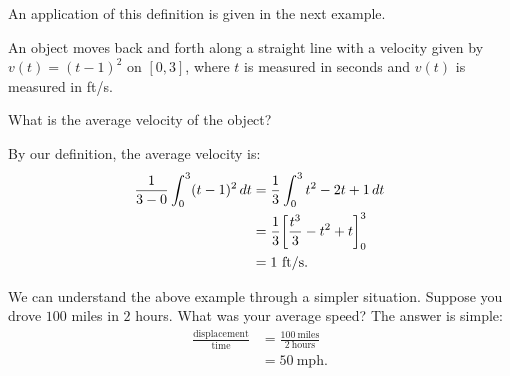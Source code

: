 \documentclass{ximera}
\begin{document}
An application of this definition is given in the next example.


\begin{example}
An object moves back and forth along a straight line with a velocity
given by $v(t) = (t-1)^2$ on $[0,3]$, where $t$ is measured in seconds
and $v(t)$ is measured in ft/s.

What is the average velocity of the object?
\begin{explanation}
By our definition, the average velocity is:
\begin{align*}
\frac{1}{3-0}\int_0^3 (t-1)^2\,d t &=\frac13 \int_0^3 t^2-2t+1\,d t\\
&= \frac13\bigg[ \frac{t^3}{3}-t^2+t \bigg]_0^3\\
&= 1\text{ ft/s}.
\end{align*}
\end{explanation}
\end{example}

We can understand the above example through a simpler
situation. Suppose you drove $100$ miles in $2$ hours. What was your
average speed? The answer is simple:
\begin{align*}
  \frac{\text{displacement}}{\text{time}} &= \frac{100~\text{miles}}{2~\text{hours}}\\
  &= 50~\text{mph.}
\end{align*}
\end{document}
